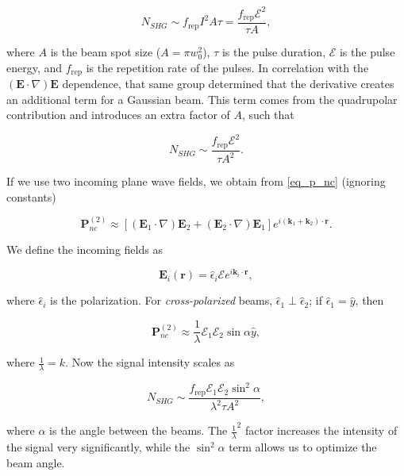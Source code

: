\begin{equation}
N_{SHG} \sim f_{\text{rep}}I^{2}A\tau = \frac{f_{\text{rep}}\mathcal{E}^{2}}{\tau A},
\end{equation}

where $A$ is the beam spot size ($A = \pi w^{2}_{0}$), $\tau$ is the pulse duration, $\mathcal{E}$ is the pulse energy, and $f_{\text{rep}}$ is the repetition rate of the pulses. In correlation with the $\left(\mathbf{E}\cdot\nabla\right)\mathbf{E}$ dependence, that same group determined that the derivative creates an additional term for a Gaussian beam. This term comes from the quadrupolar contribution and introduces an extra factor of $A$, such that

\begin{equation}
N_{SHG} \sim \frac{f_{\text{rep}}\mathcal{E}^{2}}{\tau A^{2}}.
\end{equation}

If we use two incoming plane wave fields, we obtain from \eqref{eq_p_nc} (ignoring constants)

\begin{equation}
\mathbf{P}^{(2)}_{nc} \approx \left[(\mathbf{E}_{1}\cdot\nabla)\mathbf{E}_{2} + (\mathbf{E}_{2}\cdot\nabla)\mathbf{E}_{1}\right]e^{i(\mathbf{k}_{1} + \mathbf{k}_{2})\cdot\mathbf{r}}.
\end{equation}

We define the incoming fields as

\begin{equation}
\mathbf{E}_{i}(\mathbf{r}) = \hat{\epsilon}_{i}\mathcal{E}e^{i\mathbf{k}_{i}\cdot\mathbf{r}},
\end{equation}

where $\hat{\epsilon}_{i}$ is the polarization. For \emph{cross-polarized} beams, $\hat{\epsilon}_{1}\perp\hat{\epsilon}_{2}$; if $\hat{\epsilon}_{1} = \hat{y}$, then

\begin{equation}
\mathbf{P}^{(2)}_{nc} \approx \frac{1}{\lambda}\mathcal{E}_{1}\mathcal{E}_{2}\sin\alpha\hat{y},
\end{equation}

where $\frac{1}{\lambda} = k$. Now the signal intensity scales as 

\begin{equation}
N_{SHG} \sim \frac{f_{\text{rep}}\mathcal{E}_{1}\mathcal{E}_{2}\sin^{2}\alpha}{\lambda^{2}\tau A^{2}},
\end{equation}

where $\alpha$ is the angle between the beams. The $\frac{1}{\lambda}^{2}$ factor increases the intensity of the signal very significantly, while the $\sin^{2}\alpha$ term allows us to optimize the beam angle.

